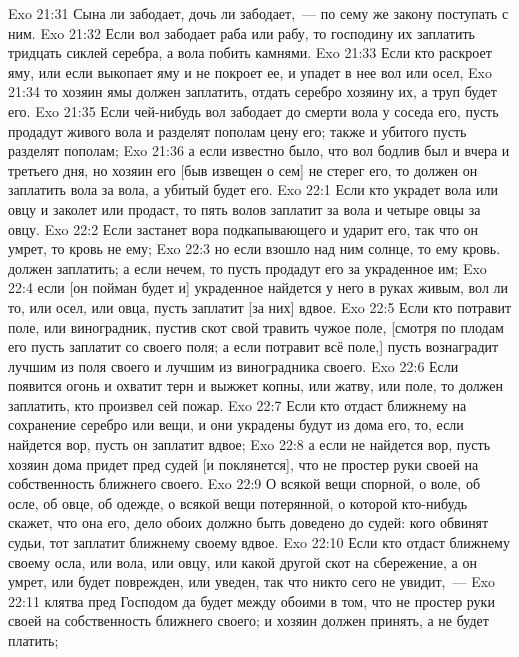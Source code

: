 \vs Exo 21:31 Сына ли забодает, дочь ли забодает,~--- по сему же закону поступать с ним.
\vs Exo 21:32 Если вол забодает раба или рабу, то господину их заплатить тридцать сиклей серебра, а вола побить камнями.
\rsbpar\vs Exo 21:33 Если кто раскроет яму, или если выкопает яму и не покроет ее, и упадет в нее вол или осел,
\vs Exo 21:34 то хозяин ямы должен заплатить, отдать серебро хозяину их, а труп будет его.
\rsbpar\vs Exo 21:35 Если чей-нибудь вол забодает до смерти вола у соседа его, пусть продадут живого вола и разделят пополам цену его; также и убитого пусть разделят пополам;
\vs Exo 21:36 а если известно было, что вол бодлив был и вчера и третьего дня, но хозяин его [быв извещен о сем] не стерег его, то должен он заплатить вола за вола, а убитый будет его.
\vs Exo 22:1 Если кто украдет вола или овцу и заколет или продаст, то пять волов заплатит за вола и четыре овцы за овцу.
\rsbpar\vs Exo 22:2 Если  застанет вора подкапывающего и ударит его, так что он умрет, то кровь не  ему;
\vs Exo 22:3 но если взошло над ним солнце, то  ему кровь.  должен заплатить; а если нечем, то пусть продадут его  за украденное им;
\vs Exo 22:4 если [он пойман будет и] украденное найдется у него в руках живым, вол ли то, или осел, или овца, пусть заплатит [за них] вдвое.
\rsbpar\vs Exo 22:5 Если кто потравит поле, или виноградник, пустив скот свой травить чужое поле, [смотря по плодам его пусть заплатит со своего поля; а если потравит всё поле,] пусть вознаградит лучшим из поля своего и лучшим из виноградника своего.
\rsbpar\vs Exo 22:6 Если появится огонь и охватит терн и выжжет копны, или жатву, или поле, то должен заплатить, кто произвел сей пожар.
\rsbpar\vs Exo 22:7 Если кто отдаст ближнему на сохранение серебро или вещи, и они украдены будут из дома его, то, если найдется вор, пусть он заплатит вдвое;
\vs Exo 22:8 а если не найдется вор, пусть хозяин дома придет пред судей [и поклянется], что не простер руки своей на собственность ближнего своего.
\vs Exo 22:9 О всякой вещи спорной, о воле, об осле, об овце, об одежде, о всякой вещи потерянной, о которой кто-нибудь скажет, что она его, дело обоих должно быть доведено до судей: кого обвинят судьи, тот заплатит ближнему своему вдвое.
\rsbpar\vs Exo 22:10 Если кто отдаст ближнему своему осла, или вола, или овцу, или какой другой скот на сбережение, а он умрет, или будет поврежден, или уведен, так что никто сего не увидит,~---
\vs Exo 22:11 клятва пред Господом да будет между обоими в том, что  не простер руки своей на собственность ближнего своего; и хозяин должен принять, а  не будет платить;
